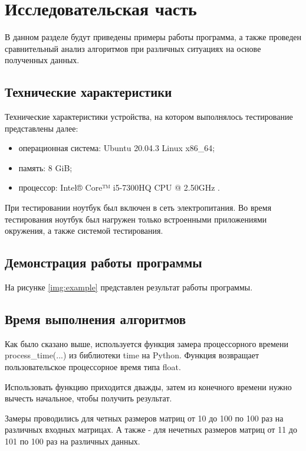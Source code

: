 \chapter{Исследовательская часть}

В данном разделе будут приведены примеры работы программа, а также проведен сравнительный анализ алгоритмов при различных ситуациях на основе полученных данных.

\section{Технические характеристики}

Технические характеристики устройства, на котором выполнялось тестирование представлены далее:

\begin{itemize}
    \item операционная система: Ubuntu 20.04.3 \cite{ubuntu} Linux \cite{linux} x86\_64;
    \item память: 8 GiB;
    \item процессор: Intel® Core™ i5-7300HQ CPU @ 2.50GHz \cite{intel}.
\end{itemize}

При тестировании ноутбук был включен в сеть электропитания. Во время тестирования ноутбук был нагружен только встроенными приложениями окружения, а также системой тестирования.

\section{Демонстрация работы программы}

На рисунке \ref{img:example} представлен результат работы программы.

\clearpage

\section{Время выполнения алгоритмов}

Как было сказано выше, используется функция замера процессорного времени process\_time(...) из библиотеки time на Python. Функция возвращает пользовательское процессорное время типа float.

Использовать функцию приходится дважды, затем из конечного времени нужно вычесть начальное, чтобы получить результат.

Замеры проводились для четных размеров матриц от 10 до 100 по 100 раз на различных входных матрицах. А также - для нечетных размеров матриц от 11 до 101 по 100 раз на различных данных.

